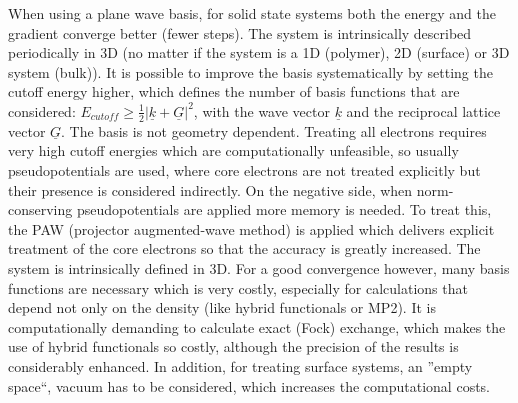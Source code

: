 \documentclass[11pt,DIV=13,BCOR=5mm,a4paper,headinclude]{scrbook}
\renewcommand{\vec}[1]{\underline{#1}}
\begin{document}
When using a plane wave basis, for solid state systems both the energy and the gradient converge better (fewer steps).
The system is intrinsically described periodically in 3D (no matter if the system is a 1D (polymer), 2D (surface) or 3D system (bulk)).
It is possible to improve the basis systematically by setting the cutoff energy higher, which defines the number of basis functions that are considered: $E_{cutoff}\geq \frac{1}{2}|\vec{k}+\vec{G}|^2$, with the wave vector $\vec{k}$ and the reciprocal lattice vector $\vec{G}$.
The basis is not geometry dependent.
Treating all electrons requires very high cutoff energies  which are computationally unfeasible, so usually pseudopotentials are used, where core electrons are not treated explicitly but their presence is considered indirectly.
On the negative side, when norm-conserving pseudopotentials are applied more memory is needed.
To treat this, the PAW (projector augmented-wave method)\cite{paw1,Kresse1999} is applied which delivers explicit treatment of the core electrons so that the accuracy is greatly increased.
The system is intrinsically defined in 3D.
For a good convergence however, many basis functions are necessary which is very costly, especially for calculations that depend not only on the density (like hybrid functionals or MP2).
It is computationally demanding to calculate exact (Fock) exchange, which makes the use of hybrid functionals so costly, although the precision of the results is considerably enhanced.
In addition, for treating surface systems, an ''empty space``, vacuum has to be considered, which increases the computational costs.
\\
\end{document}
